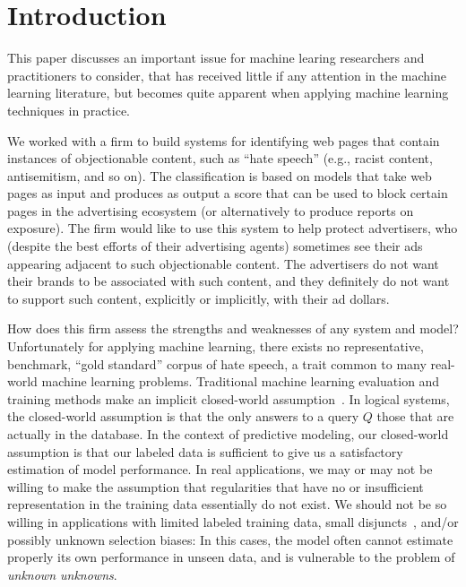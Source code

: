 \section{Introduction}
\label{sec:intro}

This paper discusses an important issue for machine learing researchers and practitioners to consider, that has received little if any attention in the machine learning literature, but becomes quite apparent when applying machine learning techniques in practice.

We worked with a firm to build systems for identifying web pages that contain instances of objectionable content, such as ``hate speech'' (e.g., racist content, antisemitism, and so on). The classification is based on models that take web pages as input and produces as output a score that can be used to block certain pages in the advertising ecosystem (or alternatively to produce reports on exposure).  The firm would like to use this system to help protect advertisers, who (despite the best efforts of their advertising agents) sometimes see their ads appearing adjacent to such objectionable content.  The advertisers do not want their brands to be associated with such content, and they definitely do not want to support such content, explicitly or implicitly, with their ad dollars. 



How does this firm assess the strengths and weaknesses of any system
and model?  Unfortunately for applying machine learning, there exists 
no representative, benchmark, ``gold standard'' corpus of hate speech, 
a trait common to many real-world machine learning problems.
Traditional machine learning evaluation and training
methods make an implicit closed-world
assumption~\cite{Reiter77closedworld}. In logical systems, the
closed-world assumption is that the only answers to a query $Q$ those
that are actually in the database. In the context of predictive
modeling, our closed-world assumption is that our labeled 
data is sufficient to give us a satisfactory estimation of
model performance. In real applications, we may or may not be willing
to make the assumption that regularities that have no or insufficient
representation in the training data essentially do not exist. We
should not be so willing in applications with limited labeled training
data, small disjuncts~\cite{weiss10disjunct}, and/or possibly unknown
selection biases: In this cases, the model often cannot estimate properly
its own performance in unseen data, and is vulnerable to the problem
of \emph{unknown unknowns}.

